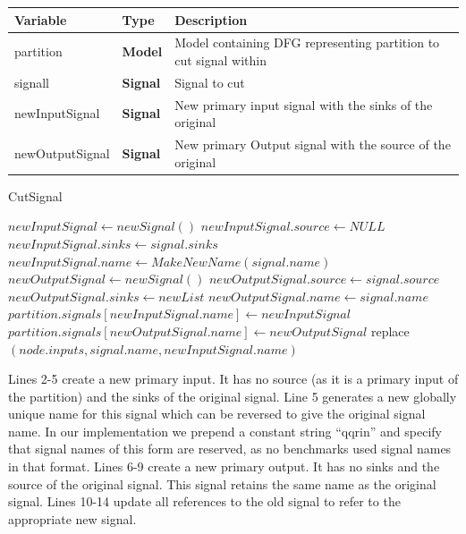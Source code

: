 \documentclass[12pt,final,oneside]{dwThesis} %
\begin{document}
   \begin{algorithm}

      \begin{center}

         \begin{tabularx}
            {\linewidth}{llX} \toprule
            Variable & Type & Description\\
            \midrule
            partition & \textbf{Model} & Model containing DFG representing partition to cut signal within \\
            signall & \textbf{Signal} & Signal to cut \\
            newInputSignal & \textbf{Signal} & New primary input signal with the sinks of the original\\
            newOutputSignal & \textbf{Signal} & New primary Output signal with the source of the original\\
            \bottomrule 
         \end{tabularx}


      \end{center}
      \caption{CutSignal}\label{algCutsignal}

      \begin{algorithmic}[1]
      		\State $newInputSignal \gets new Signal()$
      		\State $newInputSignal.source \gets NULL$
      		\State $newInputSignal.sinks \gets signal.sinks$
      		\State $newInputSignal.name \gets MakeNewName(signal.name)$ 
      		\State $newOutputSignal \gets new Signal()$
      		\State $newOutputSignal.source \gets signal.source$
      		\State $newOutputSignal.sinks \gets new List$ 
      		\State $newOutputSignal.name \gets signal.name$
      		\State $partition.signals[newInputSignal.name] \gets newInputSignal$
      		\State $partition.signals[newOutputSignal.name] \gets newOutputSignal$
      		\State
      			\State replace$(node.inputs, signal.name, newInputSignal.name)$ 
		\EndFor
\EndProcedure
      \end{algorithmic}
      \end{algorithm}
      Lines 2-5 create a new primary input. It has no source (as it is a primary input of the partition) and the sinks of the original signal.
      Line 5 generates a new globally unique name for this signal which can be reversed to give the original signal name. In our implementation we prepend a constant string ``qqrin'' and specify that signal names of this form are reserved, as no benchmarks used signal names in that format.
      Lines 6-9 create a new primary output. It has no sinks and the source of the original signal. This signal retains the same name as the original signal.
      Lines 10-14 update all references to the old signal to refer to the appropriate new signal.
\end{document}
